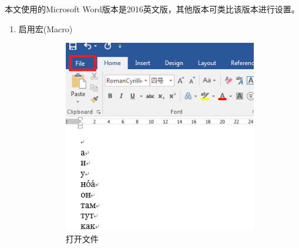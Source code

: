 \documentclass[10.5pt]{ctexart}
\begin{document}
\title{\textbf{}} 
\author{}
\maketitle
本文使用的Microsoft Word版本是2016英文版，其他版本可类比该版本进行设置。
\begin{enumerate}
\item 启用宏(Macro)
\begin{figure}[!ht]
\centering
\begin{subfigure}[b]{0.4\textwidth}
        \includegraphics[width=\textwidth]{figure1.png}
        \caption{打开文件}
        \label{openFile}
\end{subfigure}\qquad	
\begin{subfigure}[b]{0.4\textwidth}

\end{subfigure}
\end{figure}
\end{enumerate}
\end{document}
